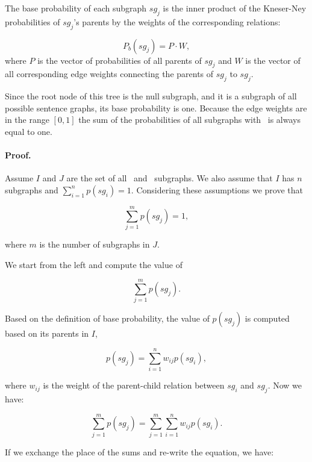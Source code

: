The base probability of each subgraph $sg_j$ is the inner product
of the Kneser-Ney probabilities of $sg_j$'s parents by the weights of
the corresponding relations:

\begin{equation}
P_b(sg_j)  = P \cdot W,
\end{equation}
%
where $P$ is the vector of probabilities of all parents of 
$sg_j$ and $W$ is the vector of all corresponding edge weights
connecting the parents of $sg_j$ to $sg_j$.

Since the root node of this tree is the null subgraph, and it is a
subgraph of all possible sentence graphs, its base probability is
one. Because the edge weights are in the range $\left[0,1\right]$ the
sum of the probabilities of all subgraphs with \knode\ is always
equal to one.

\paragraph{Proof.} 
Assume $I$ and $J$ are the set of all \knode\ and \kplusnode\
subgraphs. We also assume that $I$ has $n$ subgraphs and $\sum_{i=1}^n
p(sg_i)=1$. Considering these assumptions we prove that

\begin{equation*}
\sum_{j=1}^m p(sg_j)=1,
\end{equation*}

\noindent
where $m$ is the number of subgraphs in $J$.

We start from the left and compute the value of 

\begin{equation*}
\sum_{j=1}^m p(sg_j).
\end{equation*}

\noindent
Based on the definition of base probability, the value of
$p(sg_j)$ is computed based on its parents in $I$,

\begin{equation*}
p(sg_j)=\sum_{i=1}^n w_{ij}p(sg_i),
\end{equation*}

\noindent
where $w_{ij}$ is the weight of the parent-child relation between
$sg_i$ and $sg_j$.  Now we have:

\begin{equation*}\sum_{j=1}^m p(sg_j) = \sum_{j=1}^m\sum_{i=1}^n w_{ij}p(sg_i).
\end{equation*}

\noindent
If we exchange the place of the sums and re-write the equation, we
have: 

